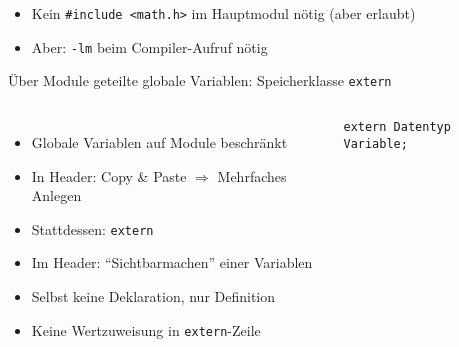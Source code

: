 
\begin{frame}[fragile]
%
%
%
\begin{itemize}
\item Kein \texttt{#include <math.h>} im Hauptmodul nötig (aber erlaubt)
\item Aber: \texttt{-lm} beim Compiler-Aufruf nötig
\end{itemize}
%
\end{frame}


\begin{frame}[fragile]{Über Module geteilte globale Variablen: Speicherklasse \texttt{extern}}
%
\begin{columns}[T]
\begin{itemize}
\item Globale Variablen auf Module beschränkt
\item In Header: Copy \& Paste $\Rightarrow$ Mehrfaches Anlegen
\item Stattdessen: \texttt{extern}
\item Im Header: \enquote{Sichtbarmachen} einer Variablen
\item Selbst keine Deklaration, nur Definition
\item Keine Wertzuweisung in \texttt{extern}-Zeile
\end{itemize}
%
\begin{codebox}[Syntax]
\texttt{extern Datentyp Variable;}
\end{codebox}
\end{columns}
%
\end{frame}

